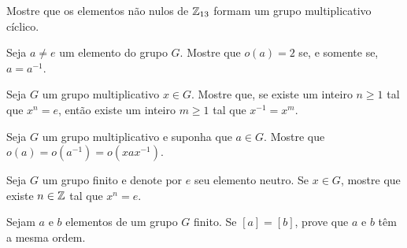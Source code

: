 \documentclass[12pt]{exam}
\begin{document}
    \vspace{.3cm}

    \questao{} Mostre que os elementos não nulos de $\mathbb{Z}_{13}$ formam um grupo multiplicativo cíclico.

    \vspace{.3cm}

    \questao{} Seja $a \ne e$ um elemento do grupo $G$. Mostre que $o(a) = 2$ se, e somente se, $a = a^{-1}$.

    \vspace{.3cm}

    \questao{} Seja $G$ um grupo multiplicativo $x \in G$. Mostre que, se existe um inteiro $n \ge 1$ tal que $x^n = e$, então existe um inteiro $m \ge 1$ tal que $x^{-1} = x^m$.

    \vspace{.3cm}

    \questao{} Seja $G$ um grupo multiplicativo e suponha que $a \in G$. Mostre que $o(a) = o(a^{-1}) = o(xax^{-1})$.

    \vspace{.3cm}

    \questao{} Seja $G$ um grupo finito e denote por $e$ seu elemento neutro. Se $x \in G$, mostre que existe $n \in \mathbb{Z}$ tal que $x^n = e$.

    \vspace{.3cm}

    \questao{} Sejam $a$ e $b$ elementos de um grupo $G$ finito. Se $[a] = [b]$, prove que $a$ e $b$ têm a mesma ordem.
\end{document}
